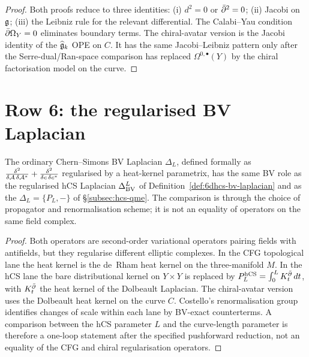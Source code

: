 \begin{proof}
Both proofs reduce to three identities: (i) $d^2=0$ or $\bar\partial^2 = 0$;
(ii) Jacobi on $\mathfrak{g}$; (iii) the Leibniz rule for the relevant
differential.
The Calabi--Yau condition $\bar\partial\Omega_Y = 0$ eliminates boundary
terms. The chiral-avatar version is the Jacobi identity of the
$\widehat{\mathfrak{g}}_k$ OPE on $C$. It has the same Jacobi--Leibniz pattern
only after the Serre-dual/Ran-space comparison has replaced
$\Omega^{0,\bullet}(Y)$ by the chiral factorisation model on the
curve.
\end{proof}

\section{Row 6: the regularised BV Laplacian}
\label{sec:cfg-row-6-bv-laplacian}

\begin{theorem}
\label{thm:cfg-row-6}
The ordinary Chern--Simons BV Laplacian $\Delta_L$, defined formally as
$\frac{\delta^2}{\delta\mathcal{A}\,\delta\mathcal{A}^*}
+ \frac{\delta^2}{\delta c\,\delta c^*}$
regularised by a heat-kernel parametrix, has the same BV role as the
regularised hCS Laplacian $\Delta_{\mathrm{BV}}^L$ of
Definition~\ref{def:6dhcs-bv-laplacian} and as the
$\Delta_L = \{P_L,-\}$ of
\S\ref{subsec:hcs-qme}. The comparison is through the choice of
propagator and renormalisation scheme; it is not an equality of
operators on the same field complex.
\end{theorem}

\begin{proof}
Both operators are second-order variational operators pairing fields
with antifields, but they regularise different elliptic complexes. In
the CFG topological lane the heat kernel is the de~Rham heat kernel on
the three-manifold $M$. In the hCS lane the bare distributional kernel
on $Y\times Y$ is replaced by
$P_L^{\mathrm{hCS}}=\int_0^L K_t^{\bar\partial}\,dt$, with $K_t^{\bar\partial}$ the heat
kernel of the Dolbeault Laplacian. The chiral-avatar version uses the
Dolbeault heat kernel on the curve $C$. Costello's renormalisation group
identifies changes of scale within each lane by BV-exact counterterms.
A comparison between the hCS parameter $L$ and the curve-length
parameter is therefore a one-loop statement after the specified
pushforward reduction, not an equality of the CFG and chiral
regularisation operators.
\end{proof}

